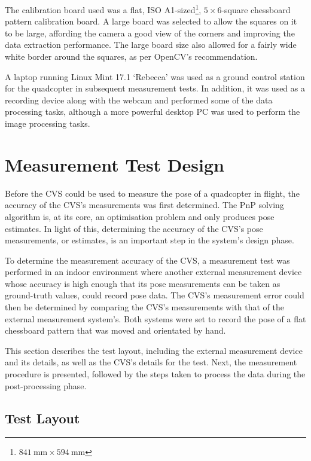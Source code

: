 The calibration board used was a flat, ISO A1-sized\footnote{$\SI{841}{\mm}\times\SI{594}{\mm}$}, $5\times6$-square chessboard pattern calibration board. A large board was selected to allow the squares on it to be large, affording the camera a good view of the corners and improving the data extraction performance. The large board size also allowed for a fairly wide white border around the squares, as per OpenCV's recommendation. 

A laptop running Linux Mint 17.1 `Rebecca' was used as a ground control station for the quadcopter in subsequent measurement tests. In addition, it was used as a recording device along with the webcam and performed some of the data processing tasks, although a more powerful desktop PC was used to perform the image processing tasks. 

\section{Measurement Test Design}

Before the CVS could be used to measure the pose of a quadcopter in flight, the accuracy of the CVS's measurements was first determined. The PnP solving algorithm is, at its core, an optimisation problem and only produces pose estimates. In light of this, determining the accuracy of the CVS's pose measurements, or estimates, is an important step in the system's design phase. 

To determine the measurement accuracy of the CVS, a measurement test was performed in an indoor environment where another external measurement device whose accuracy is high enough that its pose measurements can be taken as ground-truth values, could record pose data. The CVS's measurement error could then be determined by comparing the CVS's measurements with that of the external measurement system's. Both systems were set to record the pose of a flat chessboard pattern that was moved and orientated by hand.

This section describes the test layout, including the external measurement device and its details, as well as the CVS's details for the test. Next, the measurement procedure is presented, followed by the steps taken to process the data during the post-processing phase. 

\subsection{Test Layout}
\label{sec:vicon-test-setup}

